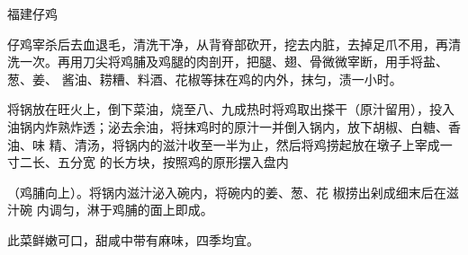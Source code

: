 \begin{recipe}{福建仔鸡}

\ingredients


\cooking

\step 仔鸡宰杀后去血退毛，清洗干净，从背脊部砍开，挖去内脏，去掉足爪不用，再清
洗一次。再用刀尖将鸡脯及鸡腿的肉剖开，把腿、翅、骨微微宰断，用手将盐、葱、姜、
酱油、耢糟、料酒、花椒等抹在鸡的内外，抹匀，渍一小时。

\step 将锅放在旺火上，倒下菜油，烧至八、九成热时将鸡取出搽干（原汁留用），投入
油锅内炸熟炸透；泌去余油，将抹鸡时的原汁一并倒入锅内，放下胡椒、白糖、香油、味
精、清汤，将锅内的滋汁收至一半为止，然后将鸡捞起放在墩子上宰成一寸二长、五分宽
的长方块，按照鸡的原形摆入盘内

（鸡脯向上）。将锅内滋汁泌入碗内，将碗内的姜、葱、花 椒捞出剁成细末后在滋汁碗
内调匀，淋于鸡脯的面上即成。

\notes

此菜鲜嫩可口，甜咸中带有麻味，四季均宜。

\end{recipe}

